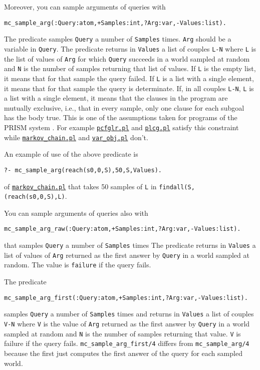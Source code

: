 Moreover, you can sample arguments of queries with
\begin{verbatim}
mc_sample_arg(:Query:atom,+Samples:int,?Arg:var,-Values:list).
\end{verbatim}
The predicate samples \verb|Query| a number of \verb|Samples| times.
\verb|Arg| should be a variable in \verb|Query|.
The predicate returns in \verb|Values| a list of couples \verb|L-N| where
\verb|L| is the list of values of \verb|Arg| for which \verb|Query|
succeeds in a world sampled at random and \verb|N|
is the number of samples returning that list of values.
If \verb|L| is the empty list, it means that for that
sample the query failed.
If \verb|L| is a list with a
single element, it means that for that sample the query is
determinate.
If, in all couples \verb|L-N|, \verb|L|
is a list with a
single element, it means that the clauses in the program
are mutually exclusive, i.e., that in every sample, only
one clause for each subgoal has the body true. This is one
of the assumptions taken for programs of the PRISM system \cite{DBLP:journals/jair/SatoK01}.
For example
\href{http://cplint.ml.unife.it/example/inference/pcfglr.pl}{\texttt{pcfglr.pl}} and \href{http://cplint.ml.unife.it/example/inference/plcg.pl}{\texttt{plcg.pl}} satisfy this constraint while
 \href{http://cplint.ml.unife.it/example/inference/markov_chain.pl}{\texttt{markov\_chain.pl}} and \href{http://cplint.ml.unife.it/example/inference/var_obj.pl}{\texttt{var\_obj.pl}} don't.


An example of use of the above predicate is
\begin{verbatim}
?- mc_sample_arg(reach(s0,0,S),50,S,Values).
\end{verbatim}
of \href{http://cplint.ml.unife.it/example/inference/markov_chain.pl}{\texttt{markov\_chain.pl}}
that takes 50 samples of \verb|L| in \verb|findall(S,(reach(s0,0,S),L)|.

You can sample arguments of queries also with
\begin{verbatim}
mc_sample_arg_raw(:Query:atom,+Samples:int,?Arg:var,-Values:list).
\end{verbatim}
that samples \verb|Query| a number of \verb|Samples| times
The predicate returns in \verb|Values| a list of values
of \verb|Arg|  returned as the first answer by \verb|Query|  in
a world sampled at random.
The value is \verb|failure| if the query fails.

The predicate
\begin{verbatim}
mc_sample_arg_first(:Query:atom,+Samples:int,?Arg:var,-Values:list).
\end{verbatim}
samples \verb|Query| a number of \verb|Samples| times
and returns in \verb|Values| a list of couples \verb|V-N| where
\verb|V| is the value of \verb|Arg| returned as the first answer by \verb|Query| in
a world sampled at random and \verb|N| is the number of samples
returning that value.
\verb|V| is failure if the query fails.
\verb|mc_sample_arg_first/4| differs from \verb|mc_sample_arg/4| because the first just computes the first
answer of the query for each sampled world.


